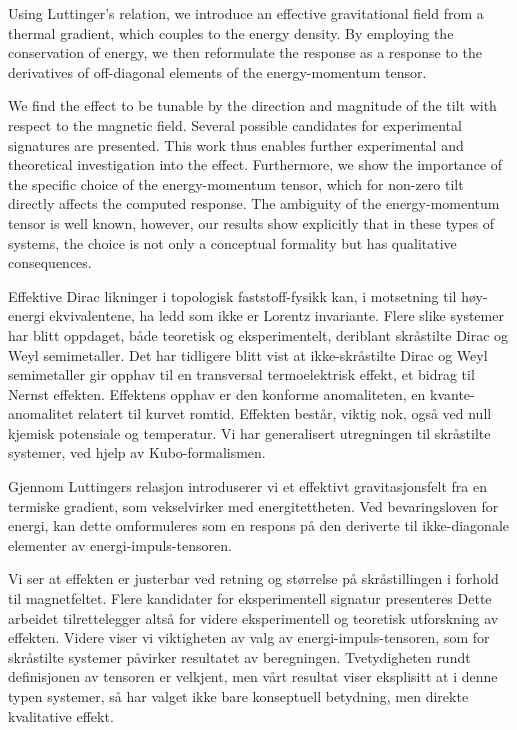 Using Luttinger's relation, we introduce an effective gravitational field from a thermal gradient, which couples to the energy density.
By employing the conservation of energy, we then reformulate the response as a response to the derivatives of off-diagonal elements of the energy-momentum tensor.

We find the effect to be tunable by the direction and magnitude of the tilt with respect to the magnetic field.
Several possible candidates for experimental signatures are presented.
This work thus enables further experimental and theoretical investigation into the effect.
Furthermore, we show the importance of the specific choice of the energy-momentum tensor, which for non-zero tilt directly affects the computed response.
The ambiguity of the energy-momentum tensor is well known, however, our results show explicitly that in these types of systems, the choice is not only a conceptual formality but has qualitative consequences.

Effektive Dirac likninger i topologisk faststoff-fysikk kan, i motsetning til høy-energi ekvivalentene, ha ledd som ikke er Lorentz invariante.
Flere slike systemer har blitt oppdaget, både teoretisk og eksperimentelt, deriblant skråstilte Dirac og Weyl semimetaller.
Det har tidligere blitt vist at ikke-skråstilte Dirac og Weyl semimetaller gir opphav til en transversal  termoelektrisk effekt, et bidrag til Nernst effekten.
Effektens opphav er den konforme anomaliteten, en kvante-anomalitet relatert til kurvet romtid.
Effekten består, viktig nok, også ved null kjemisk potensiale og temperatur.
Vi har generalisert utregningen til skråstilte systemer, ved hjelp av Kubo-formalismen.

Gjennom Luttingers relasjon introduserer vi et effektivt gravitasjonsfelt fra en termiske gradient, som vekselvirker med energitettheten.
Ved bevaringsloven for energi, kan dette omformuleres som en respons på den deriverte til ikke-diagonale elementer av energi-impuls-tensoren.

Vi ser at effekten er justerbar ved retning og størrelse på skråstillingen i forhold til magnetfeltet.
Flere kandidater for eksperimentell signatur presenteres
Dette arbeidet tilrettelegger altså for videre eksperimentell og teoretisk utforskning av effekten.
Videre viser vi viktigheten av valg av energi-impuls-tensoren, som for skråstilte systemer påvirker resultatet av beregningen.
Tvetydigheten rundt definisjonen av tensoren er velkjent, men vårt resultat viser eksplisitt at i denne typen systemer, så har valget ikke bare konseptuell betydning, men direkte kvalitative effekt.
